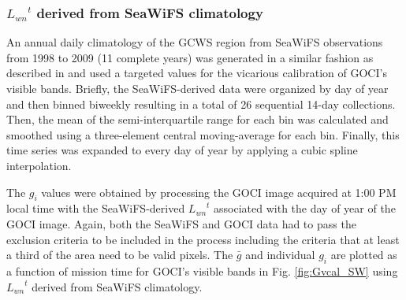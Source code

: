 \documentclass[10pt]{article}
\begin{document}
\subsubsection{${L_{wn}}^t$ derived from SeaWiFS climatology}
An annual daily climatology of the GCWS region from SeaWiFS observations from 1998 to 2009 (11 complete years) was generated in a similar fashion as described in \cite{Werdell:07} and used a targeted values for the vicarious calibration of GOCI's visible bands.
Briefly, the SeaWiFS-derived data were organized by day of year and then binned biweekly resulting in a total of 26 sequential 14-day collections. 
Then, the mean of the semi-interquartile range for each bin was calculated and smoothed using a three-element central moving-average for each bin.
Finally, this time series was expanded to every day of year by applying a cubic spline interpolation.

The $g_i$ values were obtained by processing the GOCI image acquired at 1:00 PM local time with the SeaWiFS-derived ${L_{wn}}^t$ associated with the day of year of the GOCI image.
Again, both the SeaWiFS and GOCI data had to pass the exclusion criteria to be included in the process including the criteria that at least a third of the area need to be valid pixels.
The $\bar{g}$ and individual $g_i$ are plotted as a function of mission time for GOCI's visible bands in Fig. \ref{fig:Gvcal_SW} using ${L_{wn}}^t$ derived from SeaWiFS climatology. 
\end{document}
